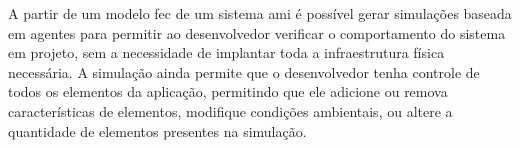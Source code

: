     A partir de um modelo \acrshort{fec} de um sistema \acrshort{ami} é possível gerar simulações baseada em agentes para permitir ao desenvolvedor verificar o comportamento do sistema em projeto, sem a necessidade de implantar toda a infraestrutura física necessária. A simulação ainda permite que o desenvolvedor tenha controle de todos os elementos da aplicação, permitindo que ele adicione ou remova características de elementos, modifique condições ambientais, ou altere a quantidade de elementos presentes na simulação.
    
    
    
    
    
    
